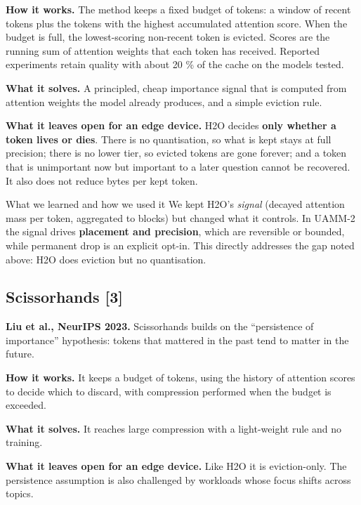 \documentclass[12pt,a4paper]{report}
\begin{document}
\textbf{How it works.} The method keeps a fixed budget of tokens: a window of recent tokens plus the tokens with the highest accumulated attention score. When the budget is full, the lowest-scoring non-recent token is evicted. Scores are the running sum of attention weights that each token has received. Reported experiments retain quality with about 20 \% of the cache on the models tested.

\textbf{What it solves.} A principled, cheap importance signal that is computed from attention weights the model already produces, and a simple eviction rule.

\textbf{What it leaves open for an edge device.} H2O decides \textbf{only whether a token lives or dies}. There is no quantisation, so what is kept stays at full precision; there is no lower tier, so evicted tokens are gone forever; and a token that is unimportant now but important to a later question cannot be recovered. It also does not reduce bytes per kept token.

\begin{calloutbox}{What we learned and how we used it}
We kept H2O's \textit{signal} (decayed attention mass per token, aggregated to blocks) but changed what it controls. In UAMM-2 the signal drives \textbf{placement and precision}, which are reversible or bounded, while permanent drop is an explicit opt-in. This directly addresses the gap noted above: H2O does eviction but no quantisation.

\end{calloutbox}
\subsection{Scissorhands [3]}
\textbf{Liu et al., NeurIPS 2023.} Scissorhands builds on the “persistence of importance” hypothesis: tokens that mattered in the past tend to matter in the future.

\textbf{How it works.} It keeps a budget of tokens, using the history of attention scores to decide which to discard, with compression performed when the budget is exceeded.

\textbf{What it solves.} It reaches large compression with a light-weight rule and no training.

\textbf{What it leaves open for an edge device.} Like H2O it is eviction-only. The persistence assumption is also challenged by workloads whose focus shifts across topics.
\end{document}
